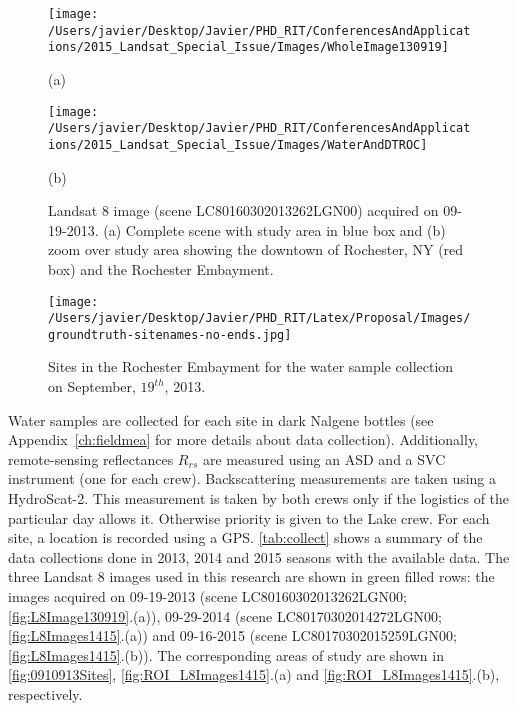 \begin{figure}[htb!]
    \begin{minipage}[c]{0.48\linewidth}
      \centering
      \texttt{[image: /Users/javier/Desktop/Javier/PHD\_RIT/ConferencesAndApplications/2015\_Landsat\_Special\_Issue/Images/WholeImage130919]}
      \centerline{(a)}\medskip
    \end{minipage}
    \hfill
    \begin{minipage}[d]{0.48\linewidth}
      \centering
      \texttt{[image: /Users/javier/Desktop/Javier/PHD\_RIT/ConferencesAndApplications/2015\_Landsat\_Special\_Issue/Images/WaterAndDTROC]}
      \centerline{(b)}\medskip
    \end{minipage}  
    \caption{Landsat 8 image (scene LC80160302013262LGN00) acquired on 09-19-2013. (a) Complete scene with study area in blue box and (b) zoom over study area showing the downtown of Rochester, NY (red box) and the Rochester Embayment. \label{fig:L8Image130919} }
\end{figure}

\begin{figure}[htb]
  \centering
  \texttt{[image: /Users/javier/Desktop/Javier/PHD\_RIT/Latex/Proposal/Images/groundtruth-sitenames-no-ends.jpg]}
  \caption{Sites in the Rochester Embayment for the water sample collection on September, $19^{th}$, 2013.\label{fig:0910913Sites} } 
\end{figure}

Water samples are collected for each site in dark Nalgene bottles (see Appendix~\ref{ch:fieldmea} for more details about data collection). Additionally, remote-sensing reflectances $R_{rs}$ are measured using an ASD and a SVC instrument (one for each crew). Backscattering measurements are taken using a HydroScat-2. This measurement is taken by both crews only if the logistics of the particular day allows it. Otherwise priority is given to the Lake crew. For each site, a location is recorded using a GPS. \autoref{tab:collect} shows a summary of the data collections done in 2013, 2014 and 2015 seasons with the available data.  The three Landsat 8 images used in this research are shown in green filled rows: the images acquired on 09-19-2013 (scene LC80160302013262LGN00; \autoref{fig:L8Image130919}.(a)), 09-29-2014 (scene LC80170302014272LGN00; \autoref{fig:L8Images1415}.(a)) and 09-16-2015 (scene LC80170302015259LGN00; \autoref{fig:L8Images1415}.(b)). The corresponding areas of study are shown in \autoref{fig:0910913Sites}, \autoref{fig:ROI_L8Images1415}.(a) and \autoref{fig:ROI_L8Images1415}.(b), respectively.

